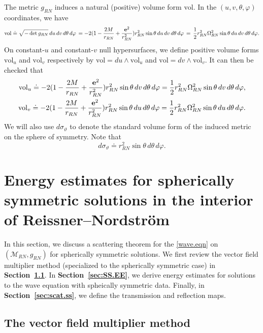 \documentclass[10pt, reqno]{amsart}
\theoremstyle{definition}
\theoremstyle{remark}
\numberwithin{equation}{section}
\newcommand{\0}{\emptyset}
\newcommand{\tht}{\theta}
\newcommand{\Omg}{\Omega}
\newcommand{\f}{\frac}
\newcommand{\vol}{\mathrm{vol}}
\begin{document}
The metric $g_{RN}$ induces a natural (positive) volume form $\vol$. In the $(u,v,\theta,\varphi)$ coordinates, we have
\begin{equation}\label{vol.est}
\vol \doteq \sqrt{-\det g_{RN}} \, du\,dv\, d\tht\, d\varphi \, = -2(1-\f{2M}{r_{RN}}+ \f{{\bf e}^2}{r_{RN}^2}) r_{RN}^2 \sin\tht \, du\,dv\, d\tht\, d\varphi\,= \, \f 12 r_{RN}^2\Omg_{RN}^2 \sin\tht\, du\,dv\, d\tht\, d\varphi.
\end{equation}
On constant-$u$ and constant-$v$ null hypersurfaces, we define positive volume forms $\vol_u$ and $\vol_v$ respectively by $\vol = du\wedge \vol_u$ and $\vol = dv\wedge \vol_v$. It can then be checked that
\begin{equation}\label{eq:vol.u.v}
\begin{split}
\vol_u \doteq -2(1-\f{2M}{r_{RN}}+ \f{{\bf e}^2}{r_{RN}^2}) r_{RN}^2 \sin\tht \,dv\, d\tht\, d\varphi = \f 12 r_{RN}^2\Omg_{RN}^2 \sin \tht \,dv\, d\tht\, d\varphi,\\
\vol_v \doteq -2(1-\f{2M}{r_{RN}}+ \f{{\bf e}^2}{r_{RN}^2}) r_{RN}^2 \sin\tht \,du\, d\tht\, d\varphi = \f 12 r_{RN}^2\Omg_{RN}^2 \sin \tht\, du\, d\tht\, d\varphi.
\end{split}
\end{equation}
We will also use $d\sigma_{\vartheta}$ to denote the standard volume form of the induced metric on the sphere of symmetry. Note that
$$d\sigma_{\vartheta} \doteq r_{RN}^2 \sin\tht \, d\tht\, d\varphi.$$

\section{Energy estimates for spherically symmetric solutions in the interior of Reissner--Nordstr\"om}\label{sec:scattering}

In this section, we discuss a scattering theorem for the \eqref{wave.eqn} on $(\mathcal M_{RN},g_{RN})$ for spherically symmetric solutions. We first review the vector field multiplier method (specialized to the spherically symmetric case) in \textbf{Section~\ref{sec:vector.field.method}}. In \textbf{Section~\ref{sec:SS.EE}}, we derive energy estimates for solutions to the wave equation with spheically symmetric data. Finally, in \textbf{Section~\ref{sec:scat.ss}}, we define the transmission and reflection maps.



\subsection{The vector field multiplier method}\label{sec:vector.field.method}
\end{document}
